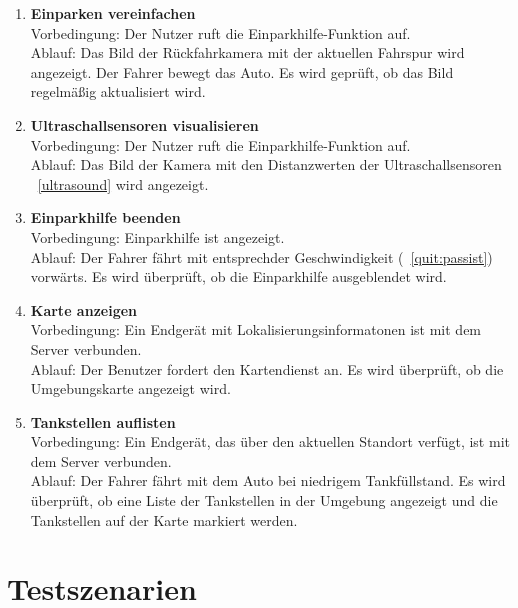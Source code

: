 \documentclass[pflichtenheft.tex]{subfiles}
\begin{document}
\begin{enumerate}
\item{\textbf{Einparken vereinfachen}} \\
Vorbedingung: Der Nutzer ruft die Einparkhilfe-Funktion auf. \\
Ablauf: Das Bild der Rückfahrkamera mit der aktuellen Fahrspur wird angezeigt. Der Fahrer bewegt das Auto. Es wird geprüft, ob das Bild regelmäßig aktualisiert wird.

\item{\textbf{Ultraschallsensoren visualisieren}} \\
Vorbedingung: Der Nutzer ruft die Einparkhilfe-Funktion auf. \\
Ablauf: Das Bild der Kamera mit den Distanzwerten der Ultraschallsensoren ~\ref{ultrasound} wird angezeigt.

\item{\textbf{Einparkhilfe beenden}} \\
Vorbedingung: Einparkhilfe ist angezeigt. \\
Ablauf: Der Fahrer fährt mit entsprechder Geschwindigkeit (~\ref{quit:passist}) vorwärts. Es wird überprüft, ob die Einparkhilfe ausgeblendet wird.


\item{\textbf{Karte anzeigen}} \\
Vorbedingung: Ein Endgerät mit Lokalisierungsinformatonen ist mit dem
Server verbunden.\\
Ablauf: Der Benutzer fordert den Kartendienst an. Es wird überprüft, ob die Umgebungskarte angezeigt wird.

\item{\textbf{Tankstellen auflisten}} \\
Vorbedingung: Ein Endgerät, das über den aktuellen Standort verfügt, ist mit dem Server verbunden.\\
Ablauf: Der Fahrer fährt mit dem Auto bei niedrigem Tankfüllstand. Es wird überprüft, ob eine Liste der Tankstellen in der Umgebung angezeigt und die Tankstellen auf der Karte markiert werden. 

\end{enumerate}

\chapter{Testszenarien}
\end{document}

